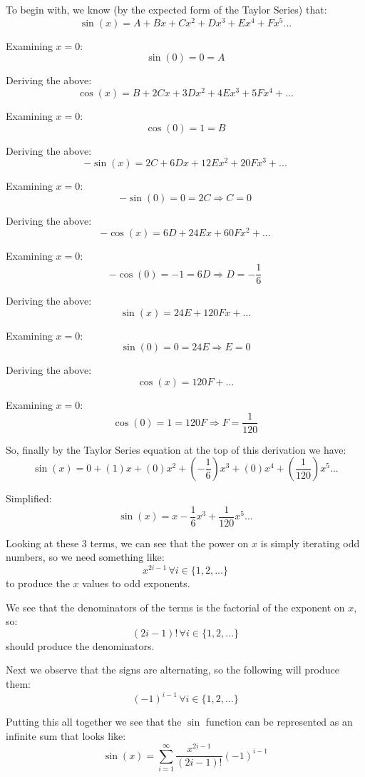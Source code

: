 \documentclass{article}
\begin{document}
To begin with, we know (by the expected form of the Taylor Series) that:
\[
  \sin \left( x \right) = A + B x + C x^2 + D x^3 + E x^4 + F x^5...
\] 

Examining $x = 0$:
\[
  \sin \left( 0 \right) = 0 = A
\]

Deriving the above:
\[
  \cos \left( x \right) = B + 2 C x + 3 D x^2 + 4 E x^3 + 5 F x^4 + ...
\]

Examining $x = 0$:
\[
  \cos \left( 0 \right) = 1 = B
\]

Deriving the above:
\[
  - \sin \left( x \right) = 2 C + 6 D x + 12 E x^2 + 20 F x^3 + ...
\]

Examining $x = 0$:
\[
  - \sin \left( 0 \right) = 0 = 2 C \Rightarrow C = 0
\]

Deriving the above:
\[
  - \cos \left( x \right) = 6 D + 24 E x + 60 F x^2 + ...
\]

Examining $x = 0$:
\[
  - \cos \left( 0 \right) = -1 = 6 D \Rightarrow D = - \frac{1}{6}
\]

Deriving the above:
\[
  \sin \left( x \right) = 24 E + 120 F x + ...
\]

Examining $x = 0$:
\[
  \sin \left( 0 \right) = 0 = 24 E \Rightarrow E = 0
\]

Deriving the above:
\[
  \cos \left( x \right) = 120 F + ...
\]

Examining $x = 0$:
\[
  \cos \left( 0 \right) = 1 = 120 F \Rightarrow F = \frac{1}{120}
\]

So, finally by the Taylor Series equation at the top of this derivation we have:
\[
  \sin \left( x \right) = 0 + \left(1\right) x + \left(0\right) x^2 + \left(-\frac{1}{6}\right) x^3 + \left(0\right) x^4 + \left(\frac{1}{120}\right) x^5 ...
\]

Simplified:
\[
  \sin \left( x \right) = x - \frac{1}{6} x^3 + \frac{1}{120} x^5 ...
\]

Looking at these 3 terms, we can see that the power on $x$ is simply iterating odd numbers, so we need something like:
\[
  x^{2 i - 1} \, \forall i \in \{ 1, 2, ...\}
\]
to produce the $x$ values to odd exponents.


We see that the denominators of the terms is the factorial of the exponent on $x$, so:
\[
  \left( 2 i - 1 \right)! \, \forall i \in \{1, 2, ...\}
\]
should produce the denominators.

Next we observe that the signs are alternating, so the following will produce them:
\[
  \left( -1 \right)^{i-1} \, \forall i \in \{1,2,...\}
\]

Putting this all together we see that the $\sin$ function can be represented as an infinite sum that looks like:
\[
  \sin \left(x \right) = \sum_{i = 1}^{\infty} \frac{x^{2 i - 1}}{\left( 2 i - 1 \right)!} \left( -1 \right)^{i - 1}
\]
\end{document}
